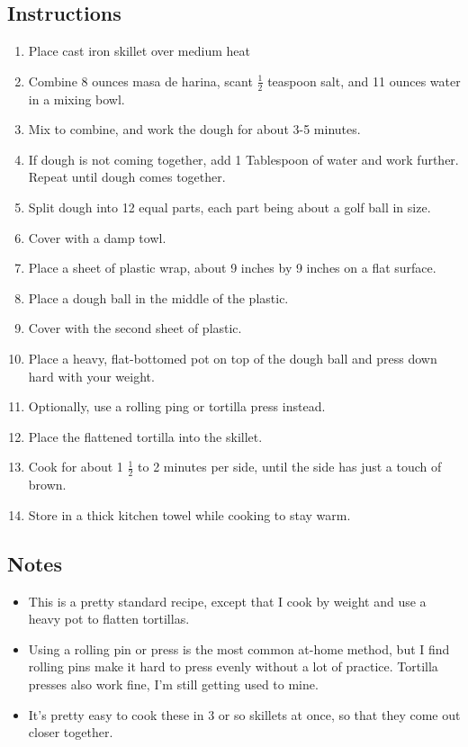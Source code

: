 \begin{multicols}{2}
\subsection*{Instructions}
\begin{enumerate}
    \item Place cast iron skillet over medium heat
    \item Combine 8 ounces masa de harina, scant \( \frac{1}{2} \) teaspoon salt, and 11 ounces water in a mixing bowl.
    \item Mix to combine, and work the dough for about 3-5 minutes.
    \item If dough is not coming together, add 1 Tablespoon of water and work further. Repeat until dough comes together.
    \item Split dough into 12 equal parts, each part being about a golf ball in size.
    \item Cover with a damp towl.
    \item Place a sheet of plastic wrap, about 9 inches by 9 inches on a flat surface.
    \item Place a dough ball in the middle of the plastic.
    \item Cover with the second sheet of plastic.
    \item Place a heavy, flat-bottomed pot on top of the dough ball and press down hard with your weight.
    \item Optionally, use a rolling ping or tortilla press instead.
    \item Place the flattened tortilla into the skillet.
    \item Cook for about 1 \( \frac{1}{2} \) to 2 minutes per side, until the side has just a touch of brown.
    \item Store in a thick kitchen towel while cooking to stay warm.
\end{enumerate}

\subsection*{Notes}
\begin{itemize}
    \item This is a pretty standard recipe, except that I cook by weight and use a heavy pot to flatten tortillas.
    \item Using a rolling pin or press is the most common at-home method, but I find rolling pins make it hard to press evenly without a lot of practice. Tortilla presses also work fine, I'm still getting used to mine.
    \item It's pretty easy to cook these in 3 or so skillets at once, so that they come out closer together.
\end{itemize}
\end{multicols}
\clearpage